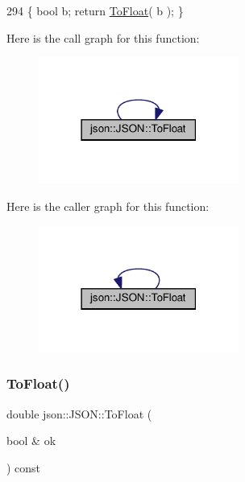 \begin{DoxyCode}
294 \{ \textcolor{keywordtype}{bool} b; \textcolor{keywordflow}{return} \mbox{\hyperlink{classjson_1_1_j_s_o_n_ae6ff6af2be133af569a9c3dd38f67d93}{ToFloat}}( b ); \}
\end{DoxyCode}
Here is the call graph for this function\+:
\nopagebreak
\begin{figure}[H]
\begin{center}
\leavevmode
\includegraphics[width=186pt]{classjson_1_1_j_s_o_n_ae6ff6af2be133af569a9c3dd38f67d93_cgraph}
\end{center}
\end{figure}
Here is the caller graph for this function\+:
\nopagebreak
\begin{figure}[H]
\begin{center}
\leavevmode
\includegraphics[width=186pt]{classjson_1_1_j_s_o_n_ae6ff6af2be133af569a9c3dd38f67d93_icgraph}
\end{center}
\end{figure}
\mbox{\label{classjson_1_1_j_s_o_n_ae913234cd95a1338faf8e198b5a0eb38}} 
\subsubsection{\texorpdfstring{To\+Float()}{ToFloat()}\hspace{0.1cm}{\footnotesize\ttfamily [2/2]}}
{\footnotesize\ttfamily double json\+::\+J\+S\+O\+N\+::\+To\+Float (\begin{DoxyParamCaption}\item[{bool \&}]{ok }\end{DoxyParamCaption}) const\hspace{0.3cm}{\ttfamily [inline]}}



